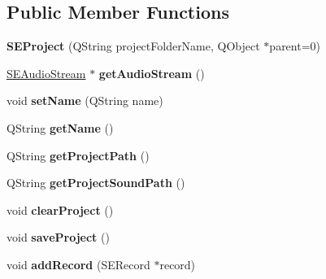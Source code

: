 \subsection*{Public Member Functions}
\begin{DoxyCompactItemize}
\item 
\hypertarget{class_s_e_project_ac2f839342520e02740af686e3d067703}{{\bfseries S\+E\+Project} (Q\+String project\+Folder\+Name, Q\+Object $\ast$parent=0)}\label{class_s_e_project_ac2f839342520e02740af686e3d067703}

\item 
\hypertarget{class_s_e_project_a7b42ff1cf09ed8c7a0ae70b6df5c1654}{\hyperlink{class_s_e_audio_stream}{S\+E\+Audio\+Stream} $\ast$ {\bfseries get\+Audio\+Stream} ()}\label{class_s_e_project_a7b42ff1cf09ed8c7a0ae70b6df5c1654}

\item 
\hypertarget{class_s_e_project_a0ab936035b3df3bd82bf6f28488e9bab}{void {\bfseries set\+Name} (Q\+String name)}\label{class_s_e_project_a0ab936035b3df3bd82bf6f28488e9bab}

\item 
\hypertarget{class_s_e_project_ad2d4c5ac6dc7aaacdabf94ce20408def}{Q\+String {\bfseries get\+Name} ()}\label{class_s_e_project_ad2d4c5ac6dc7aaacdabf94ce20408def}

\item 
\hypertarget{class_s_e_project_acb93acf37e7efad3abf19eb157146037}{Q\+String {\bfseries get\+Project\+Path} ()}\label{class_s_e_project_acb93acf37e7efad3abf19eb157146037}

\item 
\hypertarget{class_s_e_project_a073414bd0ed96671a8ed55722c4136a2}{Q\+String {\bfseries get\+Project\+Sound\+Path} ()}\label{class_s_e_project_a073414bd0ed96671a8ed55722c4136a2}

\item 
\hypertarget{class_s_e_project_a191586c8f8464149aa101709b3b712b9}{void {\bfseries clear\+Project} ()}\label{class_s_e_project_a191586c8f8464149aa101709b3b712b9}

\item 
\hypertarget{class_s_e_project_ad0dc83a89c70e8a670d2e0eb0381e632}{void {\bfseries save\+Project} ()}\label{class_s_e_project_ad0dc83a89c70e8a670d2e0eb0381e632}

\item 
\hypertarget{class_s_e_project_ae52dee786ff60fa56ec078a45db79293}{void {\bfseries add\+Record} (S\+E\+Record $\ast$record)}\label{class_s_e_project_ae52dee786ff60fa56ec078a45db79293}


\end{DoxyCompactItemize}

